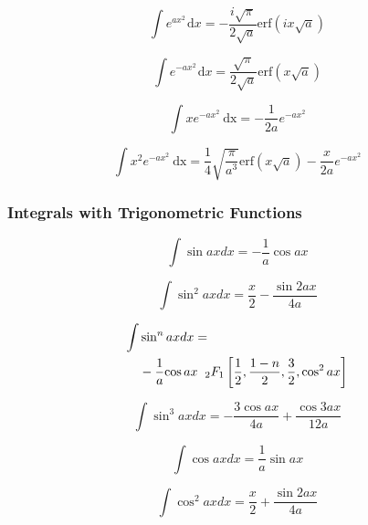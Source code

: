 \documentclass[11pt, letterpaper, notitlepage]{article}
\begin{document}
\begin{multicols}{2}
\begin{footnotesize}
\begin{equation}
\int e^{ax^2}\hspace{1pt}\text{d}x = -\frac{i\sqrt{\pi}}{2\sqrt{a}}\text{erf}\left(ix\sqrt{a}\right) 
\end{equation}

\begin{equation}
\int e^{-ax^2}\hspace{1pt}\text{d}x = \frac{\sqrt{\pi}}{2\sqrt{a}}\text{erf}\left(x\sqrt{a}\right) 
\end{equation}

\begin{equation}
\int x e^{-ax^2}\ \text{dx} = -\dfrac{1}{2a}e^{-ax^2} 
\end{equation}

\begin{equation}
\int x^2 e^{-ax^2}\ \text{dx} = \dfrac{1}{4}\sqrt{\dfrac{\pi}{a^3}}\text{erf}(x\sqrt{a}) -\dfrac{x}{2a}e^{-ax^2}
\end{equation}

\subsubsection{Integrals with Trigonometric Functions}

\begin{equation}
\int \sin ax dx = -\frac{1}{a} \cos ax 
\end{equation}

\begin{equation}
\int \sin^2 ax dx = \frac{x}{2} - \frac{\sin 2ax} {4a} 
\end{equation}

\begin{align}
\int &\sin^n ax dx =
\nonumber \\ &
 -\frac{1}{a}{\cos ax} \hspace{2mm}{_2F_1}\left[
\frac{1}{2}, \frac{1-n}{2}, \frac{3}{2}, \cos^2 ax
\right] 
\end{align}

\begin{equation}
\int \sin^3 ax dx = -\frac{3 \cos ax}{4a} + \frac{\cos 3ax} {12a} 
\end{equation}

\begin{equation}
\int \cos ax dx= \frac{1}{a} \sin ax 
\end{equation}

\begin{equation}
\int \cos^2 ax dx = \frac{x}{2}+\frac{ \sin 2ax}{4a} 
\end{equation}


\end{footnotesize}
\end{multicols}
\end{document}
